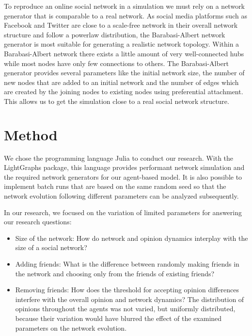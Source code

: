 \documentclass[runningheads]{llncs}
\providecommand{\tightlist}{%
  \setlength{\itemsep}{0pt}\setlength{\parskip}{0pt}}
\begin{document}
To reproduce an online social network in a simulation we must rely on a
network generator that is comparable to a real network. As social media
platforms such as Facebook and Twitter are close to a scale-free network
in their overall network structure and follow a powerlaw distribution,
the Barabasi-Albert network generator is most suitable for generating a
realistic network topology. Within a Barabasi-Albert network there
exists a little amount of very well-connected hubs while most nodes have
only few connections to others. The Barabasi-Albert generator provides
several parameters like the initial network size, the number of new
nodes that are added to an initial network and the number of edges which
are created by the joining nodes to existing nodes using preferential
attachment. This allows us to get the simulation close to a real social
network structure.

\hypertarget{method}{%
\section{Method}\label{method}}

We chose the programming language Julia to conduct our research. With
the LightGraphs package, this language provides performant network
simulation and the required network generators for our agent-based
model. It is also possible to implement batch runs that are based on the
same random seed so that the network evolution following different
parameters can be analyzed subsequently.

In our research, we focused on the variation of limited parameters for
answering our research questions:

\begin{itemize}
\tightlist
\item
  Size of the network: How do network and opinion dynamics interplay
  with the size of a social network?
\item
  Adding friends: What is the difference between randomly making friends
  in the network and choosing only from the friends of existing friends?
\item
  Removing friends: How does the threshold for accepting opinion
  differences interfere with the overall opinion and network dynamics?
  The distribution of opinions throughout the agents was not varied, but
  uniformly distributed, because their variation would have blurred the
  effect of the examined parameters on the network evolution.
\end{itemize}
\end{document}

